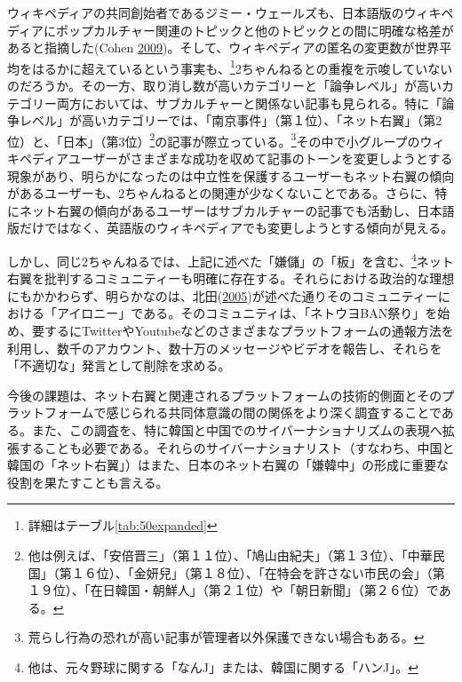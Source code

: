 \documentclass[10pt,british,A4paper,twoside]{memoir}
\begin{document}
ウィキペディアの共同創始者であるジミー・ウェールズも、日本語版のウィキペディアにポップカルチャー関連のトピックと他のトピックとの間に明確な格差があると指摘した(Cohen
\protect\hyperlink{ref-cohen_wikipedia_2009}{2009})。そして、ウィキペディアの匿名の変更数が世界平均をはるかに超えているという事実も、\footnote{詳細はテーブル\ref{tab:50expanded}}2ちゃんねるとの重複を示唆していないのだろうか。その一方、取り消し数が高いカテゴリーと「論争レベル」が高いカテゴリー両方においては、サブカルチャーと関係ない記事も見られる。特に「論争レベル」が高いカテゴリーでは、「南京事件」（第１位）、「ネット右翼」（第2位）と、「日本」（第3位）\footnote{他は例えば、「安倍晋三」（第１１位）、「鳩山由紀夫」（第１３位）、「中華民国」（第１６位）、「金妍兒」（第１８位）、「在特会を許さない市民の会」（第１９位）、「在日韓国・朝鮮人」（第２１位）や「朝日新聞」（第２６位）である。}の記事が際立っている。\footnote{荒らし行為の恐れが高い記事が管理者以外保護できない場合もある。}その中で小グループのウィキペディアユーザーがさまざまな成功を収めて記事のトーンを変更しようとする現象があり、明らかになったのは中立性を保護するユーザーもネット右翼の傾向があるユーザーも、2ちゃんねるとの関連が少なくないことである。さらに、特にネット右翼の傾向があるユーザーはサブカルチャーの記事でも活動し、日本語版だけではなく、英語版のウィキペディアでも変更しようとする傾向が見える。

しかし、同じ2ちゃんねるでは、上記に述べた「嫌儲」の「板」を含む、\footnote{他は、元々野球に関する「なんJ」または、韓国に関する「ハンJ」。}ネット右翼を批判するコミュニティーも明確に存在する。それらにおける政治的な理想にもかかわらず、明らかなのは、北田(\protect\hyperlink{ref-kitada_eng:_2005}{2005})が述べた通りそのコミュニティーにおける「アイロニー」である。そのコミュニティは、「ネトウヨBAN祭り」を始め、要するにTwitterやYoutubeなどのさまざまなプラットフォームの通報方法‎を利用し、数千のアカウント、数十万のメッセージやビデオを報告し、それらを「不適切な」発言として削除を求める。

今後の課題は、ネット右翼と関連されるプラットフォームの技術的側面とそのプラットフォームで感じられる共同体意識の間の関係をより深く調査することである。また、この調査を、特に韓国と中国でのサイバーナショナリズムの表現へ拡張することも必要である。それらのサイバーナショナリスト（すなわち、中国と韓国の「ネット右翼」）はまた、日本のネット右翼の「嫌韓中」の形成に重要な役割を果たすことも言える。

\setcounter{footnote}{0}

\newpage

\tableofcontents
\end{document}
